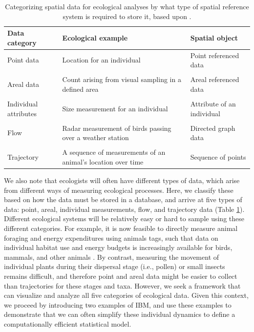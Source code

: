 \begin{table}
  \caption[Categorization of spatial data for ecological analyses]{Categorizing spatial data for ecological analyses by what type of spatial reference system is required to store it, based upon \cite{rowe_spatial_2022}.}
\begin{center}
\begin{tabularx}{\textwidth}{ | X m{2.5 in} m{1.5 in} | } 
  \hline
  Data category & Ecological example & Spatial object \\ 
  \hline

  Point data & Location for an individual & Point referenced data \\ & & \\ 
  
  Areal data & Count arising from visual sampling in a defined area & Areal referenced data  \\ & & \\ 
  
  Individual attributes & Size measurement for an individual & Attribute of an individual \\ & & \\

  Flow & Radar measurement of birds passing over a weather station & Directed graph data \\ & & \\

  Trajectory & A sequence of measurements of an animal's location over time & Sequence of points \\

  \hline
\end{tabularx}
  \label{tab:Chap1_ecological_data}
\end{center}
\end{table}

We also note that ecologists will often have different types of data, which arise from different ways of measuring ecological processes.  Here, we classify these based on how the data must be stored in a database, and arrive at five types of data:  point, areal, individual measurements, flow, and trajectory data (Table \ref{tab:Chap1_ecological_data}).  Different ecological systems will be relatively easy or hard to sample using these different categories.  For example, it is now feasible to directly measure animal foraging and energy expenditures using animals tags, such that data on individual habitat use and energy budgets is increasingly available for birds, mammals, and other animals \cite{curry_wildlife_2014}.  By contrast, measuring the movement of individual plants during their dispersal stage (i.e., pollen) or small insects remains difficult, and therefore point and areal data might be easier to collect than trajectories for these stages and taxa.  However, we seek a framework that can visualize and analyze all five categories of ecological data.  Given this context, we proceed by introducing two examples of IBM, and use these examples to demonstrate that we can often simplify these individual dynamics to define a computationally efficient statistical model.  

